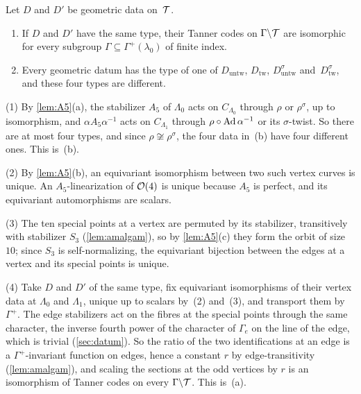 \begin{lemma}[Rigidity]\label{lem:rigidity}
\notformalized
Let $D$ and $D'$ be geometric data on~$\mathcal{T}$.
\begin{enumerate}[label=(\alph*)]
\item If $D$ and $D'$ have the same type, their Tanner codes on $\Gamma\backslash\mathcal{T}$ are isomorphic for every subgroup
$\Gamma\subseteq\Gamma^+(\lambda_0)$ of finite index.
\item Every geometric datum has the type of one of $D_{\mathrm{untw}}$, $D_{\mathrm{tw}}$, $D_{\mathrm{untw}}^\sigma$
and~$D_{\mathrm{tw}}^\sigma$, and these four types are different.
\end{enumerate}
\end{lemma}
\begin{informalproof}
(1) By \cref{lem:A5}(a), the stabilizer $A_5$ of $\Lambda_0$ acts on $C_{\Lambda_0}$ through $\rho$ or $\rho^\sigma$, up to
isomorphism, and $\alpha A_5\alpha^{-1}$ acts on $C_{\Lambda_1}$ through $\rho\circ\operatorname{Ad}\alpha^{-1}$ or its $\sigma$-twist. So
there are at most four types, and since $\rho\not\cong\rho^\sigma$, the four data in~(b) have four different ones. This
is~(b).

(2) By \cref{lem:A5}(b), an equivariant isomorphism between two such vertex curves is unique. An $A_5$-linearization of
$\mathcal{O}(4)$ is unique because $A_5$ is perfect, and its equivariant automorphisms are scalars.

(3) The ten special points at a vertex are permuted by its stabilizer, transitively with stabilizer $S_3$
(\cref{lem:amalgam}), so by \cref{lem:A5}(c) they form the orbit of size~$10$; since $S_3$ is self-normalizing, the
equivariant bijection between the edges at a vertex and its special points is unique.

(4) Take $D$ and $D'$ of the same type, fix equivariant isomorphisms of their vertex data at $\Lambda_0$ and $\Lambda_1$,
unique up to scalars by~(2) and~(3), and transport them by~$\Gamma^+$. The edge stabilizers act on the fibres at the
special points through the same character, the inverse fourth power of the character of $\Gamma_e$ on the line of the
edge, which is trivial (\cref{sec:datum}). So the ratio of the two identifications at an edge is a $\Gamma^+$-invariant
function on edges, hence a constant $r$ by edge-transitivity (\cref{lem:amalgam}), and scaling the sections at the odd
vertices by $r$ is an isomorphism of Tanner codes on every $\Gamma\backslash\mathcal{T}$. This is~(a).
\end{informalproof}


